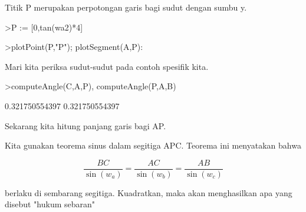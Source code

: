 \documentclass[a4paper,10pt]{article}
\begin{document}
\begin{eulernotebook}
\begin{eulercomment}
\begin{eulercomment}
\begin{eulercomment}
\begin{eulercomment}
\begin{eulercomment}
\begin{eulercomment}
\begin{eulercomment}
\begin{eulercomment}
\begin{eulercomment}
\begin{eulercomment}
\begin{eulercomment}
\begin{eulercomment}
\begin{eulercomment}
\begin{eulercomment}
\begin{eulercomment}
\begin{eulercomment}
\begin{eulercomment}
\begin{eulercomment}
\begin{eulercomment}
\begin{eulercomment}
\begin{eulercomment}
\begin{eulercomment}
\begin{eulercomment}
\begin{eulercomment}
\begin{eulercomment}
\begin{eulercomment}
\begin{eulercomment}
\begin{eulercomment}
\begin{eulercomment}
\begin{eulercomment}
\begin{eulercomment}
\begin{eulercomment}
\begin{eulercomment}
Titik P merupakan perpotongan garis bagi sudut dengan sumbu y.
\end{eulercomment}
\begin{eulerprompt}
>P := [0,tan(wa2)*4]
\end{eulerprompt}
\begin{euleroutput}
  [0,  1.33333]
\end{euleroutput}
\begin{eulerprompt}
>plotPoint(P,"P"); plotSegment(A,P):
\end{eulerprompt}
\begin{eulercomment}
Mari kita periksa sudut-sudut pada contoh spesifik kita.
\end{eulercomment}
\begin{eulerprompt}
>computeAngle(C,A,P), computeAngle(P,A,B)
\end{eulerprompt}
\begin{euleroutput}
  0.321750554397
  0.321750554397
\end{euleroutput}
\begin{eulercomment}
Sekarang kita hitung panjang garis bagi AP.

Kita gunakan teorema sinus dalam segitiga APC. Teorema ini menyatakan
bahwa

\end{eulercomment}
\begin{eulerformula}
\[
\frac{BC}{\sin(w_a)} = \frac{AC}{\sin(w_b)} = \frac{AB}{\sin(w_c)}
\]
\end{eulerformula}
\begin{eulercomment}
berlaku di sembarang segitiga. Kuadratkan, maka akan menghasilkan apa
yang disebut "hukum sebaran"


\end{eulercomment}
\end{eulercomment}
\end{eulercomment}
\end{eulercomment}
\end{eulercomment}
\end{eulercomment}
\end{eulercomment}
\end{eulercomment}
\end{eulercomment}
\end{eulercomment}
\end{eulercomment}
\end{eulercomment}
\end{eulercomment}
\end{eulercomment}
\end{eulercomment}
\end{eulercomment}
\end{eulercomment}
\end{eulercomment}
\end{eulercomment}
\end{eulercomment}
\end{eulercomment}
\end{eulercomment}
\end{eulercomment}
\end{eulercomment}
\end{eulercomment}
\end{eulercomment}
\end{eulercomment}
\end{eulercomment}
\end{eulercomment}
\end{eulercomment}
\end{eulercomment}
\end{eulercomment}
\end{eulercomment}
\end{eulernotebook}
\end{document}
